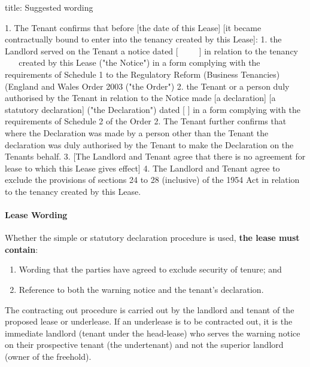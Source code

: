 \documentclass[
]{article}
\newenvironment{Shaded}{}{}
\newcommand{\NormalTok}[1]{#1}
\providecommand{\tightlist}{%
  \setlength{\itemsep}{0pt}\setlength{\parskip}{0pt}}
\begin{document}
\begin{Shaded}
\begin{Highlighting}[]
\NormalTok{title: Suggested wording}

\NormalTok{1. The Tenant confirms that before [the date of this Lease] [it became contractually bound to enter into the tenancy created by this Lease]:}
\NormalTok{    1. the Landlord served on the Tenant a notice dated [      ] in relation to the tenancy       created by this Lease ("the Notice") in a form complying with the requirements of Schedule 1 to the Regulatory Reform (Business Tenancies) (England and Wales Order 2003 ("the Order")}
\NormalTok{    2. the Tenant or a person duly authorised by the Tenant in relation to the Notice made [a declaration] [a statutory declaration] ("the Declaration") dated [ ] in a form complying with the requirements of Schedule 2 of the Order}
\NormalTok{2. The Tenant further confirms that where the Declaration was made by a person other than the Tenant the declaration was duly authorised by the Tenant to make the Declaration on the Tenant\textquotesingle{}s behalf.}
\NormalTok{3. [The Landlord and Tenant agree that there is no agreement for lease to which this Lease gives effect]  }
\NormalTok{4. The Landlord and Tenant agree to exclude the provisions of sections 24 to 28 (inclusive) of the 1954 Act in relation to the tenancy created by this Lease.}
\end{Highlighting}
\end{Shaded}

\hypertarget{lease-wording}{%
\paragraph{Lease Wording}\label{lease-wording}}

Whether the simple or statutory declaration procedure is used,
\textbf{the lease must contain}:

\begin{enumerate}
\def\labelenumi{\arabic{enumi}.}
\tightlist
\item
  Wording that the parties have agreed to exclude security of tenure;
  and
\item
  Reference to both the warning notice and the tenant's declaration.
\end{enumerate}

The contracting out procedure is carried out by the landlord and tenant
of the proposed lease or underlease. If an underlease is to be
contracted out, it is the immediate landlord (tenant under the
head-lease) who serves the warning notice on their prospective tenant
(the undertenant) and not the superior landlord (owner of the freehold).
\end{document}
